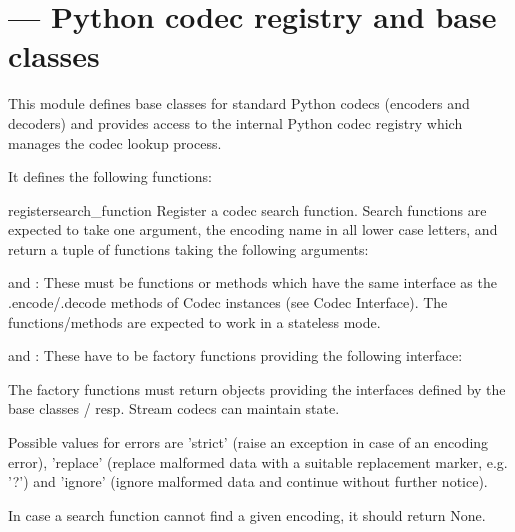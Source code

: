 \section{ ---
         Python codec registry and base classes}





This module defines base classes for standard Python codecs (encoders
and decoders) and provides access to the internal Python codec
registry which manages the codec lookup process.

It defines the following functions:

\begin{funcdesc}{register}{search_function}
Register a codec search function. Search functions are expected to
take one argument, the encoding name in all lower case letters, and
return a tuple of functions  taking the following arguments:

   and : These must be functions or methods
  which have the same interface as the .encode/.decode methods of
  Codec instances (see Codec Interface). The functions/methods are
  expected to work in a stateless mode.

   and : These have to be
  factory functions providing the following interface:


  The factory functions must return objects providing the interfaces
  defined by the base classes
  / resp. Stream codecs can
  maintain state.

  Possible values for errors are 'strict' (raise an exception in case
  of an encoding error), 'replace' (replace malformed data with a
  suitable replacement marker, e.g. '?') and 'ignore' (ignore
  malformed data and continue without further notice).

In case a search function cannot find a given encoding, it should
return None.
\end{funcdesc}

